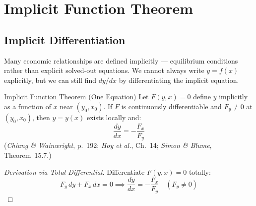 \documentclass[12pt, a4paper]{article}
\theoremstyle{definition}
\newcommand{\ddd}[2]{\dfrac{d#1}{d#2}}
\begin{document}
\section{Implicit Function Theorem}

\subsection{Implicit Differentiation}

Many economic relationships are defined implicitly --- equilibrium conditions
rather than explicit solved-out equations.  We cannot always write $y = f(x)$
explicitly, but we can still find $dy/dx$ by differentiating the implicit
equation.

\begin{thmbox}{Implicit Function Theorem (One Equation)}
Let $F(y, x) = 0$ define $y$ implicitly as a function of $x$ near
$(y_0, x_0)$.  If $F$ is continuously differentiable and $F_y \neq 0$ at
$(y_0, x_0)$, then $y = y(x)$ exists locally and:
\[
  \ddd{y}{x} = -\frac{F_x}{F_y}
\]
(\textit{Chiang \& Wainwright}, p.\ 192; \textit{Hoy et al.}, Ch.\ 14;
\textit{Simon \& Blume}, Theorem~15.7.)
\end{thmbox}

\begin{proof}[Derivation via Total Differential]
Differentiate $F(y,x) = 0$ totally:
\[
  F_y\,dy + F_x\,dx = 0
  \implies \ddd{y}{x} = -\frac{F_x}{F_y} \quad (F_y \neq 0)
\]
\end{proof}
\end{document}
